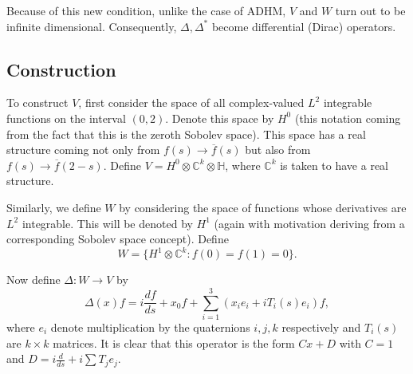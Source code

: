 	Because of this new condition, unlike the case of ADHM, $V$ and $W$ turn out to be infinite dimensional. Consequently, $\Delta, \Delta^*$ become differential (Dirac) operators.
	
	\subsection{Construction}

	To construct $V$, first consider the space of all complex-valued $L^2$ integrable functions on the interval $(0,2)$. Denote this space by $H^0$ (this notation coming from the fact that this is the zeroth Sobolev space). This space has a real structure coming not only from $f(s) \to \overline f(s)$ but also from $f(s) \to \overline f(2-s)$. Define $V = H^0 \otimes \mathbb C^k \otimes \mathbb H$, where $\mathbb C^k$ is taken to have a real structure. 

	Similarly, we define $W$ by considering the space of functions whose derivatives are $L^2$ integrable. This will be denoted by $H^1$ (again with motivation deriving from a corresponding Sobolev space concept). Define 
	$$W = \{H^1 \otimes \mathbb C^k : f(0) = f(1) = 0\}.$$


	Now define $\Delta: W \to V$ by
	\begin{equation}
		\Delta(x) f= i\frac{df}{ds} +x_0 f + \sum_{i=1}^3 (x_i e_i + i T_i(s) e_i) f,
	\end{equation}
	where $e_i$ denote multiplication by the quaternions $i,j,k$ respectively and $T_i(s)$ are $k \times k$ matrices. It is clear that this operator is the form $C x + D$ with $C = 1$ and $D = i \frac{d}{ds} + i \sum T_j e_j$.

